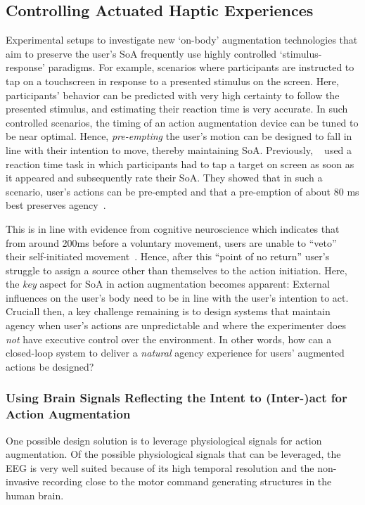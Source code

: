 \subsection{Controlling Actuated Haptic Experiences}

Experimental setups to investigate new `on-body' augmentation technologies that aim to preserve the user's SoA frequently use highly controlled `stimulus-response' paradigms. For example, scenarios where participants are instructed to tap on a touchscreen in response to a presented stimulus on the screen. Here, participants' behavior can be predicted with very high certainty to follow the presented stimulus, and estimating their reaction time is very accurate. In such controlled scenarios, the timing of an action augmentation device can be tuned to be near optimal. Hence, \textit{pre-empting} the user's motion can be designed to fall in line with their intention to move, thereby maintaining SoA. Previously, ~\citet{Kasahara2019-sk} used a reaction time task in which participants had to tap a target on screen as soon as it appeared and subsequently rate their SoA. They showed that in such a scenario, user's actions can be pre-empted and that a pre-emption of about 80 ms best preserves agency~\cite{Kasahara2019-sk, Kasahara2021-gy}. 

This is in line with evidence from cognitive neuroscience which indicates that from around 200ms before a voluntary movement, users are unable to ``veto'' their self-initiated movement~\cite{Schultze-Kraft2016-bx}. Hence, after this ``point of no return'' user's struggle to assign a source other than themselves to the action initiation. Here, the \textit{key} aspect for SoA in action augmentation becomes apparent: External influences on the user's body need to be in line with the user's intention to act. Cruciall then, a key challenge remaining is to design systems that maintain agency when user's actions are unpredictable and where the experimenter does \textit{not} have executive control over the environment. In other words, how can a closed-loop system to deliver a \textit{natural} agency experience for users' augmented actions be designed?


\subsubsection{Using Brain Signals Reflecting the Intent to (Inter-)act for Action Augmentation}
One possible design solution is to leverage physiological signals for action augmentation. Of the possible physiological signals that can be leveraged, the EEG is very well suited because of its high temporal resolution and the non-invasive recording close to the motor command generating structures in the human brain. 

